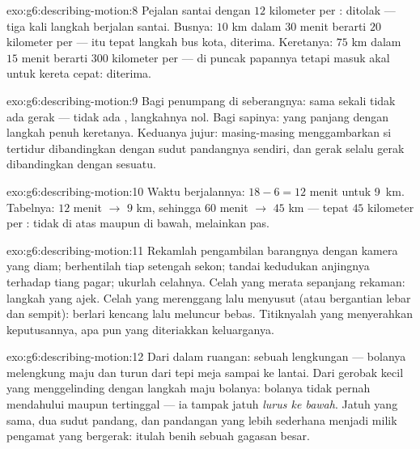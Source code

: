 \begin{solution}{exo:g6:describing-motion:8}
Pejalan santai dengan $12$ kilometer per : ditolak --- tiga kali
langkah berjalan santai. Busnya: $10$ km dalam $30$ menit berarti $20$
kilometer per  --- itu tepat langkah bus kota, diterima. Keretanya:
$75$ km dalam $15$ menit berarti $300$ kilometer per  --- di puncak
papannya tetapi masuk akal untuk kereta cepat: diterima.
\end{solution}

\begin{solution}{exo:g6:describing-motion:9}
Bagi penumpang di seberangnya: sama sekali tidak ada gerak --- tidak
ada , langkahnya nol. Bagi sapinya:  yang
panjang dengan langkah penuh keretanya. Keduanya jujur:
masing-masing menggambarkan si tertidur dibandingkan dengan sudut
pandangnya sendiri, dan gerak selalu gerak dibandingkan dengan sesuatu.
\end{solution}

\begin{solution}{exo:g6:describing-motion:10}
Waktu berjalannya: $18 - 6 = 12$ menit untuk \qty{9}{km}. Tabelnya:
$12$ menit $\to$ $9$ km, sehingga $60$ menit $\to$ $45$ km --- tepat
$45$ kilometer per : tidak di atas maupun di bawah, melainkan pas.
\end{solution}

\begin{solution}{exo:g6:describing-motion:11}
Rekamlah pengambilan barangnya dengan kamera yang diam; berhentilah
tiap setengah sekon; tandai kedudukan anjingnya terhadap tiang pagar;
ukurlah celahnya. Celah yang merata sepanjang rekaman: langkah yang
ajek. Celah yang merenggang lalu menyusut (atau bergantian lebar dan
sempit): berlari kencang lalu meluncur bebas. Titiknyalah yang
menyerahkan keputusannya, apa pun yang diteriakkan keluarganya.
\end{solution}

\begin{solution}{exo:g6:describing-motion:12}
Dari dalam ruangan: sebuah lengkungan --- bolanya melengkung maju dan
turun dari tepi meja sampai ke lantai. Dari gerobak kecil yang
menggelinding dengan langkah maju bolanya: bolanya tidak pernah
mendahului maupun tertinggal --- ia tampak jatuh \emph{lurus ke
bawah}. Jatuh yang sama, dua sudut pandang, dan pandangan yang lebih
sederhana menjadi milik pengamat yang bergerak: itulah benih sebuah
gagasan besar.
\end{solution}

